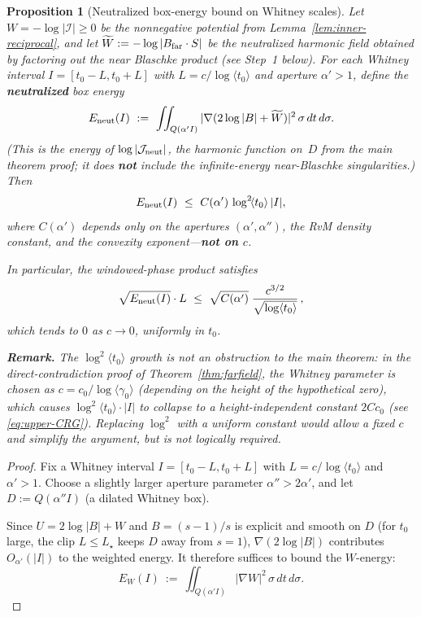 \documentclass[11pt]{amsart}
\newtheorem{proposition}[theorem]{Proposition}
\theoremstyle{definition}
\theoremstyle{remark}
\newcommand{\angles}[1]{\langle #1\rangle}
\newcommand{\rsadd}[1]{{\color{violet}#1}}
\begin{document}
\rsadd{%
\begin{proposition}[Neutralized box-energy bound on Whitney scales]\label{prop:Cbox-finite}
Let $W=-\log|\mathcal I|\ge 0$ be the nonnegative potential from Lemma~\ref{lem:inner-reciprocal},
and let $\widetilde W:=-\log|B_{\rm far}\cdot S|$ be the neutralized harmonic field
obtained by factoring out the near Blaschke product (see Step~1 below).
For each Whitney interval $I=[t_0-L,t_0+L]$ with $L=c/\log\angles{t_0}$ and
aperture $\alpha'>1$, define the \textbf{neutralized} box energy
\[
  E_{\rm neut}(I)\ :=\ \iint_{Q(\alpha' I)}|\nabla(2\log|B|+\widetilde W)|^2\,\sigma\,dt\,d\sigma.
\]
(This is the energy of \(\log|\mathcal J_{\rm neut}|\), the harmonic function on~\(D\)
from the main theorem proof; it does \textbf{not} include the infinite-energy
near-Blaschke singularities.)
Then
\begin{equation}\label{eq:box-energy-height}
  E_{\rm neut}(I)\ \le\ C(\alpha')\,\log^2\!\angles{t_0}\,|I|,
\end{equation}
where $C(\alpha')$ depends only on the apertures $(\alpha',\alpha'')$,
the RvM density constant, and the convexity exponent---\textbf{not on $c$}.

In particular, the windowed-phase product satisfies
\begin{equation}\label{eq:box-L-product}
  \sqrt{E_{\rm neut}(I)}\cdot L
  \ \le\ \sqrt{C(\alpha')}\;\frac{c^{3/2}}{\sqrt{\log\angles{t_0}}}\,,
\end{equation}
which tends to $0$ as $c\to 0$, \emph{uniformly in $t_0$}.

\medskip
\noindent\textbf{Remark.}
The $\log^2\!\angles{t_0}$ growth is \emph{not} an obstruction to the main theorem:
in the direct-contradiction proof of Theorem~\ref{thm:farfield},
the Whitney parameter is chosen as $c=c_0/\log\angles{\gamma_0}$
(depending on the height of the hypothetical zero),
which causes $\log^2\!\angles{t_0}\cdot|I|$ to collapse to a height-independent constant
$2Cc_0$ (see \eqref{eq:upper-CRG}).
Replacing $\log^2$ with a uniform constant would allow
a fixed $c$ and simplify the argument, but is not logically required.
\end{proposition}
\begin{proof}
Fix a Whitney interval \(I=[t_0-L,t_0+L]\) with \(L=c/\log\angles{t_0}\) and \(\alpha'>1\).
Choose a slightly larger aperture parameter \(\alpha''>2\alpha'\), and let
\(D:=Q(\alpha'' I)\) (a dilated Whitney box).

Since \(U=2\log|B|+W\) and \(B=(s\!-\!1)/s\) is explicit and smooth on \(D\)
(for \(t_0\) large, the clip \(L\le L_\star\) keeps \(D\) away from \(s=1\)),
\(\nabla(2\log|B|)\) contributes \(O_{\alpha'}(|I|)\) to the weighted energy.
It therefore suffices to bound the \(W\)-energy:
\[
  E_W(I)\ :=\ \iint_{Q(\alpha'I)}|\nabla W|^2\,\sigma\,dt\,d\sigma.
\]


\end{proof}}
\end{document}
